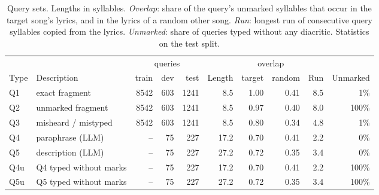 \begin{table}[t]
\centering
\caption{Query sets. Lengths in syllables. \emph{Overlap}: share of the query's unmarked syllables that occur in
the target song's lyrics, and in the lyrics of a random other song. \emph{Run}: longest run of consecutive query
syllables copied from the lyrics. \emph{Unmarked}: share of queries typed without any diacritic. Statistics on the
test split.}
\label{tab:queries}
\footnotesize
\setlength{\tabcolsep}{4.5pt}
\begin{tabular}{@{}llrrrrrrrr@{}}
\toprule
 & & \multicolumn{3}{c}{queries} & & \multicolumn{2}{c}{overlap} & & \\
\cmidrule(lr){3-5} \cmidrule(lr){7-8}
Type & Description & train & dev & test & Length & target & random & Run & Unmarked \\
\midrule
Q1 & exact fragment & 8542 & 603 & 1241 & 8.5 & 1.00 & 0.41 & 8.5 & 1\% \\
Q2 & unmarked fragment & 8542 & 603 & 1241 & 8.5 & 0.97 & 0.40 & 8.0 & 100\% \\
Q3 & misheard / mistyped & 8542 & 603 & 1241 & 8.5 & 0.80 & 0.34 & 4.8 & 1\% \\
Q4 & paraphrase (LLM) & -- & 75 & 227 & 17.2 & 0.70 & 0.41 & 2.2 & 0\% \\
Q5 & description (LLM) & -- & 75 & 227 & 27.2 & 0.72 & 0.35 & 3.4 & 0\% \\
Q4u & Q4 typed without marks & -- & 75 & 227 & 17.2 & 0.70 & 0.41 & 2.2 & 100\% \\
Q5u & Q5 typed without marks & -- & 75 & 227 & 27.2 & 0.72 & 0.35 & 3.4 & 100\% \\
\bottomrule
\end{tabular}
\end{table}
